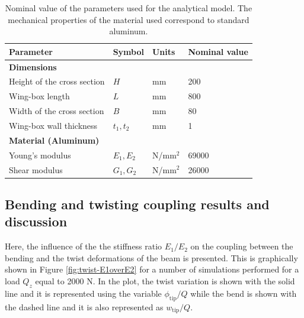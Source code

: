   \begin{table}[!htpb]
  \centering
  \begin{tabular}{|l|lll|}
  \hline
  \textbf{Parameter} & \multicolumn{1}{l|}{\textbf{Symbol}} & \multicolumn{1}{l|}{\textbf{Units}} & \textbf{Nominal value} \\ \hline \hline
  {\textbf{Dimensions}} &  &  &  \\ \hline
  Height of the cross section & \multicolumn{1}{l|}{$H$} & \multicolumn{1}{l|}{mm} & 200 \\ \hline
  Wing-box length & \multicolumn{1}{l|}{$L$} & \multicolumn{1}{l|}{mm} & 800 \\ \hline
  Width of the cross section & \multicolumn{1}{l|}{$B$} & \multicolumn{1}{l|}{mm} & 80 \\ \hline
  Wing-box wall thickness & \multicolumn{1}{l|}{$t_1, t_2$} & \multicolumn{1}{l|}{mm} & 1 \\ \hline \hline
  {\textbf{Material (Aluminum)}} &  &  &  \\ \hline
  Young's modulus & \multicolumn{1}{l|}{$E_1, E_2$} & \multicolumn{1}{l|}{N/mm$^2$} & 69000 \\ \hline
  Shear modulus & \multicolumn{1}{l|}{$G_1, G_2$} & \multicolumn{1}{l|}{N/mm$^2$} & 26000 \\ \hline
  \end{tabular}
  \caption[Nominal value of the parameters used for the analytical model]{Nominal value of the parameters used for the analytical model. The mechanical properties of the material used correspond to standard aluminum.}
  \label{tab:parameters_analytical}
  \end{table}

  \clearpage
  \subsection{Bending and twisting coupling results and discussion} \label{subsec:bendingTwistCoupling_results_model}
  
    Here, the influence of the the stiffness ratio $E_1/E_2$ on the coupling between the bending and the twist deformations of the beam is presented. This is graphically shown in Figure \ref{fig:twist-E1overE2} for a number of simulations performed for a load $Q_z$ equal to 2000 N. In the plot, the twist variation is shown with the solid line and it is represented using the variable $\phi_{\mathrm{tip}}/Q$ while the bend is shown with the dashed line and it is also represented as $w_{\mathrm{tip}}/Q$.

